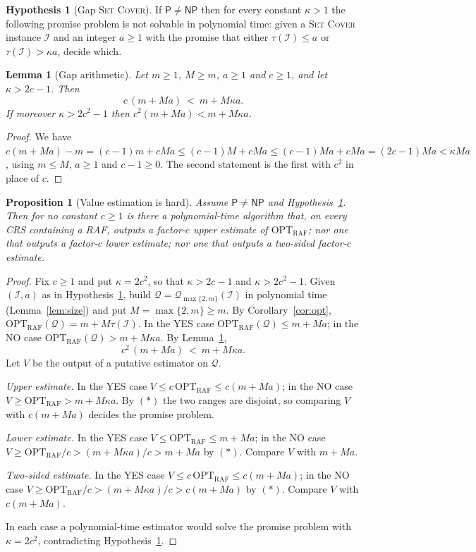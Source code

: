 \documentclass[11pt,a4paper]{article}
\theoremstyle{plain}
\newtheorem{proposition}[theorem]{Proposition}
\newtheorem{lemma}[theorem]{Lemma}
\theoremstyle{definition}
\newtheorem{hypothesis}[theorem]{Hypothesis}
\theoremstyle{remark}
\newcommand{\OPT}{\mathrm{OPT}}
\newcommand{\RAF}{\mathrm{RAF}}
\newcommand{\optraf}{\OPT_{\RAF}}
\newcommand{\cQ}{\mathcal{Q}}
\newcommand{\cI}{\mathcal{I}}
\newcommand{\tauI}{\tau(\cI)}
\newcommand{\SetCover}{\textup{\textsc{Set Cover}}}
\newcommand{\NP}{\mathsf{NP}}
\newcommand{\Ptime}{\mathsf{P}}
\begin{document}
\begin{hypothesis}[Gap \SetCover]\label{hyp:gap}
If $\Ptime\ne\NP$ then for every constant $\kappa>1$ the following promise problem is not solvable in polynomial time: given a \SetCover{} instance $\cI$ and an integer $a\ge 1$ with the promise that either $\tauI\le a$ or $\tauI>\kappa a$, decide which.
\end{hypothesis}

\begin{lemma}[Gap arithmetic]\label{lem:gaparith}
Let $m\ge 1$, $M\ge m$, $a\ge 1$ and $c\ge 1$, and let $\kappa>2c-1$. Then
\[
c\,(m+Ma)\ <\ m+M\kappa a .
\]
If moreover $\kappa>2c^2-1$ then $c^2(m+Ma)<m+M\kappa a$.
\end{lemma}

\begin{proof}
We have $c(m+Ma)-m=(c-1)m+cMa\le (c-1)M+cMa\le (c-1)Ma+cMa=(2c-1)Ma<\kappa Ma$, using $m\le M$, $a\ge 1$ and $c-1\ge 0$. The second statement is the first with $c^2$ in place of $c$.
\end{proof}

\begin{proposition}[Value estimation is hard]\label{prop:gap}
Assume $\Ptime\ne\NP$ and Hypothesis~\ref{hyp:gap}. Then for no constant $c\ge 1$ is there a polynomial-time algorithm that, on every CRS containing a RAF, outputs a factor-$c$ upper estimate of $\optraf$; nor one that outputs a factor-$c$ lower estimate; nor one that outputs a two-sided factor-$c$ estimate.
\end{proposition}

\begin{proof}
Fix $c\ge 1$ and put $\kappa=2c^2$, so that $\kappa>2c-1$ and $\kappa>2c^2-1$. Given $(\cI,a)$ as in Hypothesis~\ref{hyp:gap}, build $\cQ=\cQ_{\max\{2,m\}}(\cI)$ in polynomial time (Lemma~\ref{lem:size}) and put $M=\max\{2,m\}\ge m$. By Corollary~\ref{cor:opt}, $\optraf(\cQ)=m+M\tauI$. In the YES case $\optraf(\cQ)\le m+Ma$; in the NO case $\optraf(\cQ)>m+M\kappa a$. By Lemma~\ref{lem:gaparith},
\[
c^2\,(m+Ma)\ <\ m+M\kappa a. \tag{$\ast$}
\]
Let $V$ be the output of a putative estimator on $\cQ$.

\emph{Upper estimate.} In the YES case $V\le c\,\optraf\le c(m+Ma)$; in the NO case $V\ge\optraf>m+M\kappa a$. By $(\ast)$ the two ranges are disjoint, so comparing $V$ with $c(m+Ma)$ decides the promise problem.

\emph{Lower estimate.} In the YES case $V\le\optraf\le m+Ma$; in the NO case $V\ge\optraf/c>(m+M\kappa a)/c>m+Ma$ by $(\ast)$. Compare $V$ with $m+Ma$.

\emph{Two-sided estimate.} In the YES case $V\le c\,\optraf\le c(m+Ma)$; in the NO case $V\ge\optraf/c>(m+M\kappa a)/c>c(m+Ma)$ by $(\ast)$. Compare $V$ with $c(m+Ma)$.

In each case a polynomial-time estimator would solve the promise problem with $\kappa=2c^2$, contradicting Hypothesis~\ref{hyp:gap}.
\end{proof}
\end{document}
